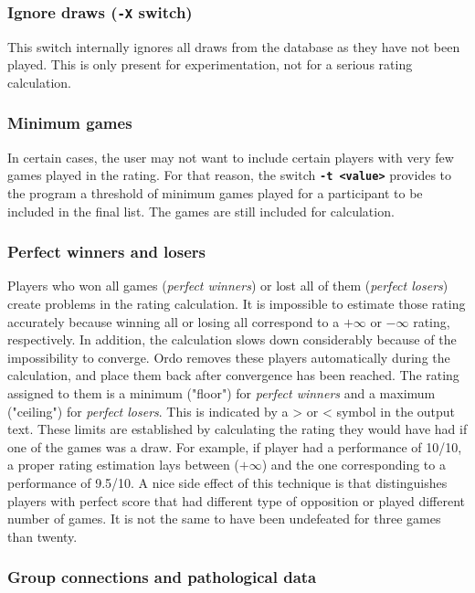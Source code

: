 \documentclass[12pt]{article}
\newcommand{\swtch} [1] {\texttt{\textbf{#1}}}
\begin{document}
\subsubsection*{Ignore draws (\swtch{-X} switch)}

This switch internally ignores all draws from the database as they have not been played.
This is only present for experimentation, not for a serious rating calculation.

\subsubsection*{Minimum games}

In certain cases, the user may not want to include certain players with very few games played in the rating. 
For that reason, the switch \swtch{-t <value>} provides to the program a threshold of minimum games played for a participant to be included in the final list.
The games are still included for calculation.

\subsubsection*{Perfect winners and losers}

Players who won all games (\textit{perfect winners}) or lost all of them (\textit{perfect losers}) create problems in the rating calculation.
It is impossible to estimate those rating accurately because winning all or losing all correspond to a $+\infty$ or $-\infty$ rating, respectively.
In addition, the calculation slows down considerably because of the impossibility to converge.
Ordo removes these players automatically during the calculation, and place them back after convergence has been reached.
The rating assigned to them is a minimum ("floor") for \textit{perfect winners} and a maximum ("ceiling") for \textit{perfect losers}.
This is indicated by a > or < symbol in the output text.
These limits are established by calculating the rating they would have had if one of the games was a draw.
For example, if player had a performance of 10/10, a proper rating estimation lays between ($+\infty$) and the one corresponding to a performance of 9.5/10.
A nice side effect of this technique is that distinguishes players with perfect score that had different type of opposition or played different number of games.
It is not the same to have been undefeated for three games than twenty.

\subsubsection*{Group connections and pathological data}
\end{document}
